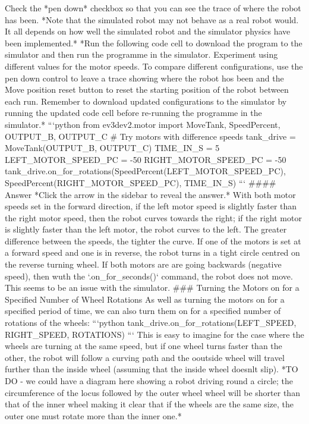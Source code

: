 \documentclass[letterpaper,10pt,english]{sphinxmanual}
\begin{document}
{Check the *pen down* checkbox so that you can see the trace of where the robot has been.
*Note that the simulated robot may not behave as a real robot would. It all depends on how well the simulated robot and the simulator physics have been implemented.*
*Run the following code cell to download the program to the simulator and then run the programme in the simulator. Experiment using different values for the motor speeds. To compare different configurations, use the pen down control to leave a trace showing where the robot hos been and the Move position reset button to reset the starting position of the robot between each run. Remember to download updated configurations to the simulator by running the updated code cell before re-running the programme in the simulator.*
```python
from ev3dev2.motor import MoveTank, SpeedPercent, OUTPUT_B, OUTPUT_C
# Try motors with difference speeds
tank_drive = MoveTank(OUTPUT_B, OUTPUT_C)
TIME_IN_S = 5
LEFT_MOTOR_SPEED_PC = -50
RIGHT_MOTOR_SPEED_PC = -50
tank_drive.on_for_rotations(SpeedPercent(LEFT_MOTOR_SPEED_PC),
                          SpeedPercent(RIGHT_MOTOR_SPEED_PC),
                          TIME_IN_S)
```
#### Answer
*Click the arrow in the sidebar to reveal the answer.*
With both motor speeds set in the forward direction, if the left motor speed is slightly faster than the right motor speed, then the robot curves towards the right; if the right motor is slightly faster than the left motor, the robot curves to the left. The greater difference between the speeds, the tighter the curve.
If one of the motors is set at a forward speed and one is in reverse, the robot turns in a tight circle centred on the reverse turning wheel.
If both motors are are going backwards (negative speed), then wuth the `.on_for_seconds()` command, the robot does not move. This seems to be an issue with the simulator.
### Turning the Motors on for a Specified Number of Wheel Rotations
As well as turning the motors on for a specified period of time, we can also turn them on for a specified number of rotations of the wheels:
```python
tank_drive.on_for_rotations(LEFT_SPEED, RIGHT_SPEED, ROTATIONS)
```
This is easy to imagine for the case where the wheels are turning at the same speed, but if one wheel turns faster than the other, the robot will follow a curving path and the ooutside wheel will travel further than the inside wheel (assuming that the inside wheel doesnlt slip).
*TO DO -  we could have a diagram here showing a robot driving round a circle; the circumference of the locus followed by the outer wheel wheel will be shorter than that of the inner wheel making it clear that if the wheels are the same size, the outer one must rotate more than the inner one.*
}
\end{document}

